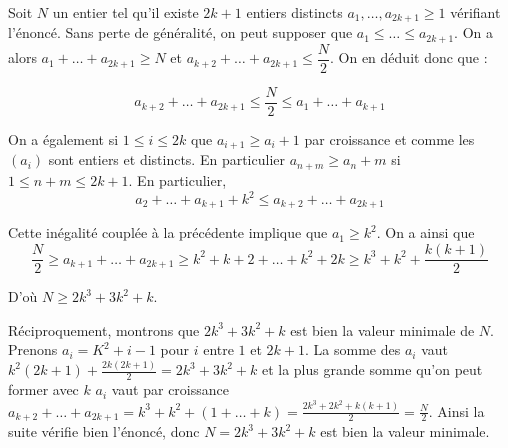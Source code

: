 Soit $N$ un entier tel qu'il existe $2k+1$ entiers distincts $a_1, \dots, a_{2k + 1} \ge 1$ vérifiant l'énoncé. Sans perte de généralité, on peut supposer que $a_1 \le \dots \le a_{2k + 1}$. On a alors $a_1 + \dots + a_{2k + 1} \ge N$ et $a_{k + 2} + \dots + a_{2k + 1} \le \dfrac{N}{2}$. On en déduit donc que :

$$a_{k+2}+\dots + a_{2k+1}\le \dfrac{N}{2}\le a_1 + \dots +a_{k+1}$$

On a également si $1\le i \le 2k$ que $a_{i+1}\ge a_i+1$ par croissance et comme les $(a_i)$ sont entiers et distincts. En particulier $a_ {n+m}\ge a_n + m$ si $1\le n+m\le 2k+1$. En particulier,
$$a_2 + \dots + a_{k + 1} + k^2 \le a_{k + 2} + \dots + a_{2k + 1}$$

Cette inégalité couplée à la précédente implique que $a_1\ge k^2$. On a ainsi que
$$\frac{N}{2} \ge a_{k + 1} + \dots + a_{2k + 1} \ge k^2 + k + 2 + \dots + k^2 + 2k \ge k^3 + k^2 + \frac{k(k+1)}{2}$$

D'où $N\ge 2k^3+3k^2+k$.

Réciproquement, montrons que $2k^3+3k^2+k$ est bien la valeur minimale de $N$. Prenons $a_i=K^2+i-1$ pour $i$ entre $1$ et $2k+1$. La somme des $a_i$ vaut $k^2(2k+1)+\frac{2k(2k+1)}{2}=2k^3+3k^2+k$ et la plus grande somme qu'on peut former avec $k$ $a_i$ vaut par croissance $a_{k+2}+\dots +a_{2k+1}=k^3+k^2+(1+\dots +k)=\frac{2k^3+2k^2+k(k+1)}{2}=\frac{N}{2}$. Ainsi la suite vérifie bien l'énoncé, donc $N=2k^3+3k^2+k$ est bien la valeur minimale.